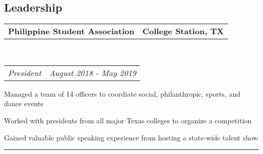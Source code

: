 \documentclass[10pt,letterpaper]{article}
\makeatletter
\newenvironment{indentsection}[1]%
{\begin{list}{}%
	{\setlength{\leftmargin}{#1}}%
	\item[]%
}
{\end{list}}
\newcommand{\headerrow}[2]
{\begin{tabular*}{\linewidth}{l@{\extracolsep{\fill}}r}
	#1 &
	#2 \\
\end{tabular*}}
\makeatother
\begin{document}
\subsection*{Leadership}
\begin{indentsection}{\parindent}
	\vspace{-0.4em}
	\headerrow
		{\textbf{Philippine Student Association}}
		{\textbf{College Station, TX}}
		\\
	\headerrow
		{\emph{President}}
		{\emph{August 2018 - May 2019}}
	\begin{itemize*}
		\item Managed a team of 14 officers to coordiate social, philanthropic, sports, and dance events
		\item Worked with presidents from all major Texas colleges to organize a competition 
		\item Gained valuable public speaking experience from hosting a state-wide talent show
	\end{itemize*}

\end{indentsection}
\newif\ifdraft
\draftfalse %

\ifdraft
\hrule
\vspace{-0.8em}
\end{document}
